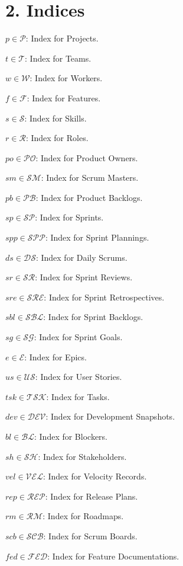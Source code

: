 \documentclass[12pt]{article}
\begin{document}
\section{2. Indices}

\item $p \in \mathcal{P}$: Index for Projects.
    \item $t \in \mathcal{T}$: Index for Teams.
    \item $w \in \mathcal{W}$: Index for Workers.
    \item $f \in \mathcal{F}$: Index for Features.
    \item $s \in \mathcal{S}$: Index for Skills.
    \item $r \in \mathcal{R}$: Index for Roles.
    \item $po \in \mathcal{PO}$: Index for Product Owners.
    \item $sm \in \mathcal{SM}$: Index for Scrum Masters.
    \item $pb \in \mathcal{PB}$: Index for Product Backlogs.
    \item $sp \in \mathcal{SP}$: Index for Sprints.
    \item $spp \in \mathcal{SPP}$: Index for Sprint Plannings.
    \item $ds \in \mathcal{DS}$: Index for Daily Scrums.
    \item $sr \in \mathcal{SR}$: Index for Sprint Reviews.
    \item $sre \in \mathcal{SRE}$: Index for Sprint Retrospectives.
    \item $sbl \in \mathcal{SBL}$: Index for Sprint Backlogs.
    \item $sg \in \mathcal{SG}$: Index for Sprint Goals.
    \item $e \in \mathcal{E}$: Index for Epics.
    \item $us \in \mathcal{US}$: Index for User Stories.
    \item $tsk \in \mathcal{TSK}$: Index for Tasks.
    \item $dev \in \mathcal{DEV}$: Index for Development Snapshots.
    \item $bl \in \mathcal{BL}$: Index for Blockers.
    \item $sh \in \mathcal{SH}$: Index for Stakeholders.
    \item $vel \in \mathcal{VEL}$: Index for Velocity Records.
    \item $rep \in \mathcal{REP}$: Index for Release Plans.
    \item $rm \in \mathcal{RM}$: Index for Roadmaps.
    \item $scb \in \mathcal{SCB}$: Index for Scrum Boards.
    \item $fed \in \mathcal{FED}$: Index for Feature Documentations.
\end{document}
